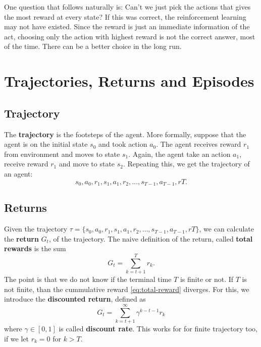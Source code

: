     One question that follows naturally is: Can't we just pick the actions that gives the most reward at every state? If this was correct,
    the reinforcement learning may not have existed. Since the reward is just an immediate information of the act, choosing only the action with
    highest reward is not the correct answer, most of the time. There can be a better choice in the long run.

\section{Trajectories, Returns and Episodes}
    \subsection{Trajectory}
        The \textbf{trajectory} is the footsteps of the agent. More formally, suppose that the agent is on the initial state $s_0$ and took action $a_0$.
        The agent receives reward $r_1$ from environment and moves to state $s_1$. Again, the agent take an action $a_1$, receive reward $r_1$ and move to state $s_2$.
        Repeating this, we get the trajectory of an agent:
        \begin{equation}
            s_0,a_0,r_1,s_1,a_1,r_2,\dots,s_{T-1},a_{T-1},r{T}. \label{eq:trajectory}
        \end{equation}
    \subsection{Returns}
        Given the trajectory $\tau = \{s_0,a_0,r_1,s_1,a_1,r_2,\dots,s_{T-1},a_{T-1},r{T}\}$, we can calculate the \textbf{return} $G_t$, of the trajectory.
        The naive definition of the return, called \textbf{total rewards} is the sum
        \begin{equation}
            G_t = \sum_{k=t+1}^{T}r_k. \label{eq:total-reward}
        \end{equation}
        The point is that we do not know if the terminal time $T$ is finite or not. If $T$ is not finite, than the cummulative reward \ref{eq:total-reward}
        diverges. For this, we introduce the \textbf{discounted return}, defined as
        \begin{equation}
            G_t = \sum_{k=t+1}^{\infty}\gamma^{k - t - 1}r_k
        \end{equation}
        where $\gamma \in [0,1]$ is called \textbf{discount rate}.
        This works for for finite trajectory too, if we let $r_k = 0$ for $k > T$.
